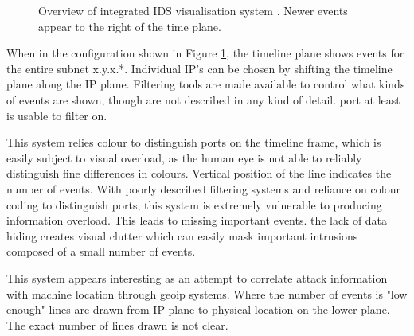 \begin{figure}[tbh]
\caption{\protect\label{integrated}Overview of integrated IDS visualisation system \cite{mukosaka2007integrated}. Newer events appear to the right of the time plane.}
\end{figure}

When in the configuration shown in Figure \ref{integrated}, the timeline plane shows events for the entire subnet x.y.x.*. Individual IP's can be chosen by shifting the timeline plane along the IP plane.
Filtering tools are made available to control what kinds of events are shown, though are not described in any kind of detail. port at least is usable to filter on. 

This system relies colour to distinguish ports on the timeline frame, which is easily subject to visual overload, as the human eye is not able to reliably distinguish fine differences in colours. Vertical position of the line indicates the number of events. With poorly described filtering systems and reliance on colour coding to distinguish ports, this system is extremely vulnerable to producing information overload. This leads to missing important events. the lack of data hiding creates visual clutter which can easily mask important intrusions composed of a small number of events. 

This system appears interesting as an attempt to correlate attack information with machine location through geoip systems. Where the number of events is "low enough" lines are drawn from IP plane to physical location on the lower plane. The exact number of lines drawn is not clear. 

